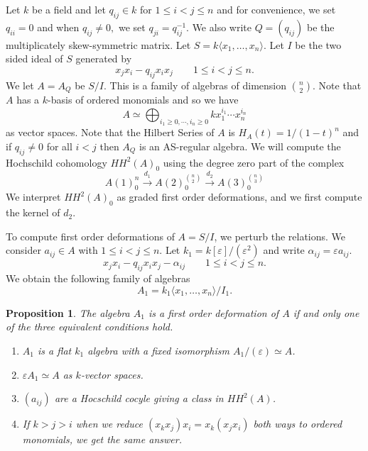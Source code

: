 \documentclass{article}
\newtheorem{proposition}{Proposition}
\begin{document}
Let $k$ be a field and let $q_{ij} \in k$ for $1 \leq i < j \leq n$ and
for convenience, we set $q_{ii}=0$ and when $q_{ij} \neq 0,$ we set $q_{ji}=q_{ij}^{-1}$.  We also write $Q  =(q_{ij})$
be the multiplicately skew-symmetric matrix.
Let $S=k\langle x_1,\ldots,x_n\rangle$.
Let $I$ be the two sided ideal of $S$ generated by
$$x_jx_i - q_{ij} x_ix_j\quad \quad 1 \leq i < j \leq n.$$
We let $A = A_Q$ be $S/I$.  This is a family of algebras of dimension $\binom{n}{2}.$
Note that $A$ has a $k$-basis of ordered monomials and so we have
$$ A \simeq \bigoplus_{i_1\geq 0,\cdots, i_n \geq 0} k x_1^{i_1}\cdots x^{i_n}_n$$
as vector spaces.  Note that the Hilbert Series of $A$ is $H_A(t) = 1/(1-t)^n$ and if $q_{ij} \neq 0$ for all $i<j$ then $A_Q$ is an AS-regular algebra.
We will compute the Hochschild cohomology
$HH^2(A)_0$ using the degree zero part of the complex
$$ A(1)^n_0 \stackrel{d_1}{\to} A(2)^{\binom{n}{2}}_0 \stackrel{d_2}{\to}
  A(3)^{\binom{n}{3}}_0 $$
  We interpret $HH^2(A)_0$ as graded first order deformations, and we first compute the kernel of $d_2$.
  
To compute  first order deformations of $A = S/I$, we perturb the relations.
We consider $a_{ij} \in A$ with $1 \leq i < j \leq n$.
Let $k_1 = k[\varepsilon]/(\varepsilon^2)$ and write $\alpha_{ij} = \varepsilon a_{ij}$.
$$x_jx_i - q_{ij} x_ix_j  - \alpha_{ij} \quad \quad 1 \leq i < j \leq n.$$
We obtain the following family of algebras
$$A_1 = k_1\langle x_1,\ldots,x_n \rangle/I_1.$$

\begin{proposition}
  The algebra $A_1$ is a {\it first order deformation} of $A$ if and only one of the three equivalent conditions hold.
  \begin{enumerate}
    \item $A_1$ is a flat $k_1$ algebra with a fixed isomorphism $A_1/(\varepsilon) \simeq A$.
    \item $\varepsilon A_1 \simeq A$ as $k$-vector spaces.
    \item $(a_{ij})$ are a Hocschild cocyle giving a class in $HH^2(A)$.
    \item If $k>j>i$ when we reduce $(x_kx_j)x_i = x_k(x_jx_i)$ both ways to ordered monomials, we get the same answer.
  \end{enumerate}
\end{proposition}
\end{document}
